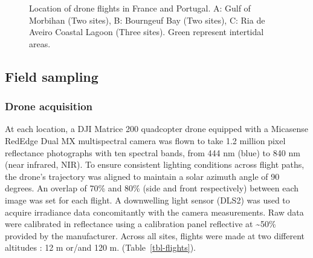 \documentclass[
  number]{elsarticle}
\begin{document}
\label{cell-fig-map}
\begin{figure}[H]


\caption{\label{fig-map}Location of drone flights in France and
Portugal. A: Gulf of Morbihan (Two sites), B: Bourngeuf Bay (Two sites),
C: Ria de Aveiro Coastal Lagoon (Three sites). Green represent
intertidal areas.}

\end{figure}%

\subsection{Field sampling}\label{field-sampling}

\subsubsection{Drone acquisition}\label{drone-acquisition}

At each location, a DJI Matrice 200 quadcopter drone equipped with a
Micasense RedEdge Dual MX multispectral camera was flown to take 1.2
million pixel reflectance photographs with ten spectral bands, from 444
nm (blue) to 840 nm (near infrared, NIR). To ensure consistent lighting
conditions across flight paths, the drone's trajectory was aligned to
maintain a solar azimuth angle of 90 degrees. An overlap of 70\% and
80\% (side and front respectively) between each image was set for each
flight. A downwelling light sensor (DLS2) was used to acquire irradiance
data concomitantly with the camera measurements. Raw data were
calibrated in reflectance using a calibration panel reflective at
\textasciitilde50\% provided by the manufacturer. Across all sites,
flights were made at two different altitudes : 12 m or/and 120 m.
(Table~\ref{tbl-flights}).
\end{document}
